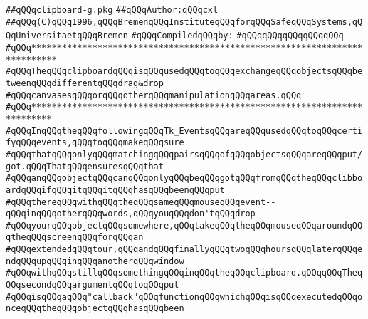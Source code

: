 \label{src/lib/tk/src/toolkit/clipboard-g.pkg}
\verb|##qQQqclipboard-g.pkg|\newline
\verb|##qQQqAuthor:qQQqcxl|\newline
\verb|##qQQq(C)qQQq1996,qQQqBremenqQQqInstituteqQQqforqQQqSafeqQQqSystems,qQQqUniversitaetqQQqBremen|\newline
\newline
\verb|#qQQqCompiledqQQqby:|\newline
\verb|#qQQqqQQqqQQqqQQqqQQq|\newline
\newline
\newline
\newline
\verb|#qQQq***************************************************************************|\newline
\verb|#qQQqTheqQQqclipboardqQQqisqQQqusedqQQqtoqQQqexchangeqQQqobjectsqQQqbetweenqQQqdifferentqQQqdrag&drop|\newline
\verb|#qQQqcanvasesqQQqorqQQqotherqQQqmanipulationqQQqareas.qQQq|\newline
\verb|#qQQq**************************************************************************|\newline
\newline
\newline
\verb|#qQQqInqQQqtheqQQqfollowingqQQqTk_EventsqQQqareqQQqusedqQQqtoqQQqcertifyqQQqevents,qQQqtoqQQqmakeqQQqsure|\newline
\verb|#qQQqthatqQQqonlyqQQqmatchingqQQqpairsqQQqofqQQqobjectsqQQqareqQQqput/got.qQQqThatqQQqensuresqQQqthat|\newline
\verb|#qQQqanqQQqobjectqQQqcanqQQqonlyqQQqbeqQQqgotqQQqfromqQQqtheqQQqclibboardqQQqifqQQqitqQQqitqQQqhasqQQqbeenqQQqput|\newline
\verb|#qQQqthereqQQqwithqQQqtheqQQqsameqQQqmouseqQQqevent--qQQqinqQQqotherqQQqwords,qQQqyouqQQqdon'tqQQqdrop|\newline
\verb|#qQQqyourqQQqobjectqQQqsomewhere,qQQqtakeqQQqtheqQQqmouseqQQqaroundqQQqtheqQQqscreenqQQqforqQQqan|\newline
\verb|#qQQqextendedqQQqtour,qQQqandqQQqfinallyqQQqtwoqQQqhoursqQQqlaterqQQqendqQQqupqQQqinqQQqanotherqQQqwindow|\newline
\verb|#qQQqwithqQQqstillqQQqsomethingqQQqinqQQqtheqQQqclipboard.qQQqqQQqTheqQQqsecondqQQqargumentqQQqtoqQQqput|\newline
\verb|#qQQqisqQQqaqQQq"callback"qQQqfunctionqQQqwhichqQQqisqQQqexecutedqQQqonceqQQqtheqQQqobjectqQQqhasqQQqbeen|\newline
